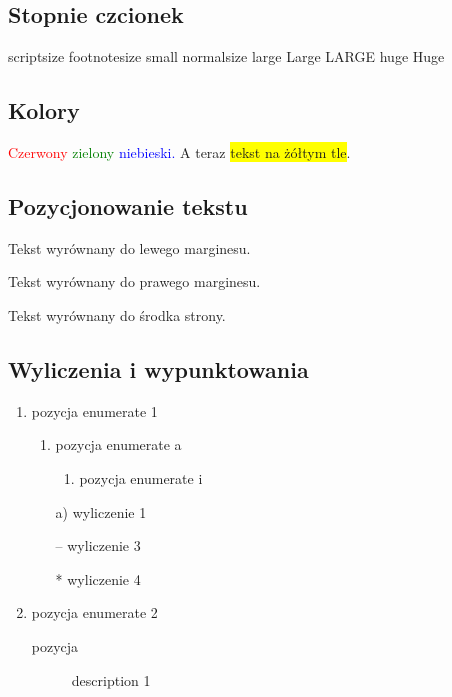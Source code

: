 \subsection{Stopnie czcionek}
 {\scriptsize scriptsize} {\footnotesize footnotesize} {\small small} {\normalsize normalsize} {\large large} {\Large Large} {\LARGE LARGE} {\huge huge} {\Huge Huge}

\subsection{Kolory}
\textcolor{red}{Czerwony} \textcolor{green}{zielony} \textcolor{blue}{niebieski.} A teraz \colorbox{yellow}{tekst na żółtym tle}.

\subsection{Pozycjonowanie tekstu}
\begin{flushleft}
Tekst wyrównany do lewego marginesu.\\
\end{flushleft}
\begin{flushright}
Tekst wyrównany do prawego marginesu.\\
\end{flushright}
\begin{center}
Tekst wyrównany do środka strony.\\
\end{center}

\subsection{Wyliczenia i wypunktowania}
\begin{enumerate}
\item pozycja enumerate 1
	\begin{enumerate}
	\item pozycja enumerate a
		\begin{enumerate}
			\item pozycja enumerate i
		\end{enumerate}
	\end{enumerate}
\begin{itemize}
	\item[a)] wyliczenie 1
	\item[--] wyliczenie 3
	\item[*] wyliczenie 4
\end{itemize}

\item pozycja enumerate 2
\begin{description}
		\item[pozycja] description 1
\end{description}
\end{enumerate}

